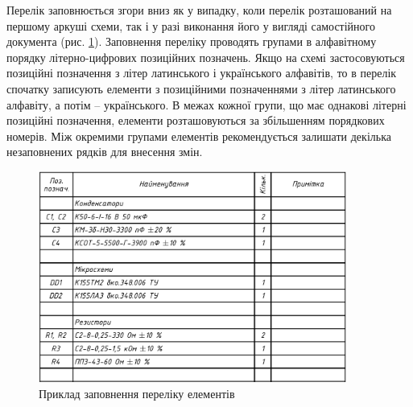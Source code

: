 Перелік заповнюється згори вниз як у випадку, коли перелік розташований на першому аркуші схеми, так і у разі виконання його у вигляді самостійного документа (рис. \ref{fig:elist}). Заповнення переліку проводять групами в алфавітному порядку літерно-цифрових позиційних позначень. Якщо на схемі застосовуються позиційні позначення з літер латинського і українського алфавітів, то в перелік спочатку записують елементи з позиційними позначеннями з літер латинського алфавіту, а потім -- українського. В межах кожної групи, що має однакові літерні позиційні позначення, елементи розташовуються за збільшенням порядкових номерів. Між окремими групами елементів рекомендується залишати декілька незаповнених рядків для внесення змін.

\begin{figure}[h]
\centering
\includegraphics[width=0.9\textwidth]{img/elist-example.pdf}
\caption{Приклад заповнення переліку елементів}
\label{fig:elist}
\end{figure}
 